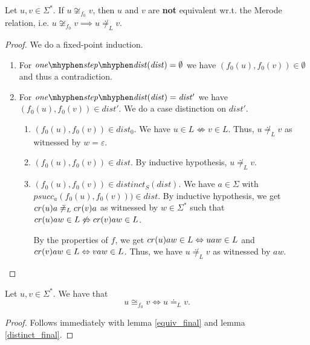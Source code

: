 \begin{lemma}
    \label{distinct_final}
    Let $u,v \in \Sigma^*$. 
    If $u \not\cong_{f_0} v$, then $u$ and $v$ are \textbf{not} equivalent wr.t. the Merode relation, i.e. $u \not\cong_{f_0} v \implies u \not\doteq_L v$.
\end{lemma}
\begin{proof}
    We do a fixed-point induction.
    \begin{enumerate}
        \item For $\mathit{one\mhyphen step\mhyphen dist}(\mathit{dist}) = \emptyset$ we have $({f_0}(u), {f_0}(v)) \in \emptyset$ and thus a contradiction. 
        \item For $\mathit{one\mhyphen step\mhyphen dist}(\mathit{dist}) = \mathit{dist'}$ we have $({f_0}(u), {f_0}(v)) \in \mathit{dist'}$. 
            We do a case distinction on $\mathit{dist'}$.
            \begin{enumerate}
                \item $({f_0}(u), {f_0}(v)) \in \mathit{dist_0}$.
                    We have $u \in L \not\Leftrightarrow v \in L$. 
                    Thus, $u \not\doteq_L v$ as witnessed by $w=\varepsilon$.
                \item $({f_0}(u), {f_0}(v)) \in \mathit{dist}$. 
                    By inductive hypothesis, $u \not\doteq_L v$.
                \item $({f_0}(u), {f_0}(v)) \in \mathit{distinct_S}(\mathit{dist})$.
                    We have $a \in \Sigma$ with $\mathit{psucc_a}({f_0}(u), {f_0}(v))) \in \mathit{dist}$.
                    By inductive hypothesis, we get $cr(u)a \not\doteq_L cr(v)a$ 
                    as witnessed by $w \in \Sigma^*$ 
                    such that $cr(u)aw \in L \not\Leftrightarrow cr(v)aw \in L$.

                    By the properties of $f$, we get $cr(u)aw \in L \Leftrightarrow uaw \in L$ and $cr(v)aw \in L \Leftrightarrow vaw \in L$.
                    Thus, we have $u \not\doteq_L v$ as witnessed by $aw$.
            \end{enumerate}
    \end{enumerate}
\end{proof}


\begin{corollary}
    \label{equivP}
    Let $u, v \in \Sigma^*$. We have that
    \begin{equation*}
        u \cong_{f_0} v \iff u \doteq_L v.
    \end{equation*}
\end{corollary}
\begin{proof}
    Follows immediately with lemma \ref{equiv_final} and lemma \ref{distinct_final}. 
\end{proof}

